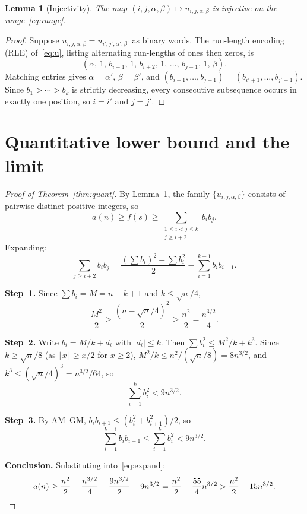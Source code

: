 ﻿\documentclass[11pt,a4paper]{article}
\theoremstyle{plain}
\newtheorem{lemma}[theorem]{Lemma}
\theoremstyle{definition}
\theoremstyle{remark}
\begin{document}
\begin{lemma}[Injectivity]\label{lem:inject}
The map $(i,j,\alpha,\beta)\mapsto u_{i,j,\alpha,\beta}$ is injective
on the range~\eqref{eq:range}.
\end{lemma}

\begin{proof}
Suppose $u_{i,j,\alpha,\beta}=u_{i',j',\alpha',\beta'}$ as binary words.
The run-length encoding (RLE) of~\eqref{eq:u}, listing alternating
run-lengths of ones then zeros, is
\[
  (\alpha,\,1,\,b_{i+1},\,1,\,b_{i+2},\,1,\,\ldots,\,b_{j-1},\,1,\,\beta).
\]
Matching entries gives $\alpha=\alpha'$, $\beta=\beta'$, and
$(b_{i+1},\ldots,b_{j-1})=(b_{i'+1},\ldots,b_{j'-1})$.  Since
$b_1>\cdots>b_k$ is strictly decreasing, every consecutive subsequence
occurs in exactly one position, so $i=i'$ and $j=j'$.
\end{proof}

\section{Quantitative lower bound and the limit}\label{sec:lower}

\begin{proof}[Proof of Theorem~\ref{thm:quant}]
By Lemma~\ref{lem:inject}, the family $\{u_{i,j,\alpha,\beta}\}$
consists of pairwise distinct positive integers, so
\begin{equation}\label{eq:f-lower}
  a(n)\ge f(s)\ge\sum_{\substack{1\le i<j\le k\\j\ge i+2}}b_i b_j.
\end{equation}
Expanding:
\begin{equation}\label{eq:expand}
  \sum_{j\ge i+2}b_i b_j
  =\frac{(\sum b_i)^2-\sum b_i^2}{2}-\sum_{i=1}^{k-1}b_i b_{i+1}.
\end{equation}

\textbf{Step~1.}  Since $\sum b_i=M=n-k+1$ and $k\le\sqrt{n}/4$,
\[
  \frac{M^2}{2}\ge\frac{(n-\sqrt{n}/4)^2}{2}
  \ge\frac{n^2}{2}-\frac{n^{3/2}}{4}.
\]

\textbf{Step~2.}  Write $b_i=M/k+d_i$ with $|d_i|\le k$.  Then
$\sum b_i^2\le M^2/k+k^3$.
Since $k\ge\sqrt{n}/8$ (as $\lfloor x\rfloor\ge x/2$ for $x\ge2$),
$M^2/k\le n^2/(\sqrt{n}/8)=8n^{3/2}$,
and $k^3\le(\sqrt{n}/4)^3=n^{3/2}/64$, so
\begin{equation}\label{eq:sumsq}
  \sum_{i=1}^k b_i^2<9n^{3/2}.
\end{equation}

\textbf{Step~3.}  By AM--GM,
$b_i b_{i+1}\le(b_i^2+b_{i+1}^2)/2$, so
\begin{equation}\label{eq:adj}
  \sum_{i=1}^{k-1}b_i b_{i+1}\le\sum_{i=1}^k b_i^2<9n^{3/2}.
\end{equation}

\textbf{Conclusion.}  Substituting into~\eqref{eq:expand}:
\[
  a(n)\ge\frac{n^2}{2}-\frac{n^{3/2}}{4}
  -\frac{9n^{3/2}}{2}-9n^{3/2}
  =\frac{n^2}{2}-\frac{55}{4}n^{3/2}>\frac{n^2}{2}-15n^{3/2}.\qedhere
\]
\end{proof}
\end{document}
